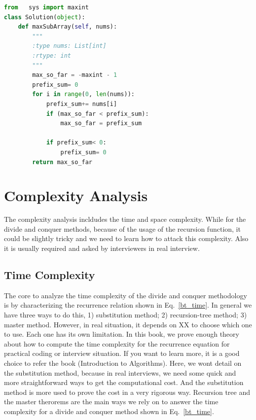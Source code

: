 \documentclass[../algorithms.tex]{subfiles}
\begin{document}
\begin{lstlisting}[language = Python]
from   sys import maxint
class Solution(object):    
    def maxSubArray(self, nums):
        """
        :type nums: List[int]
        :rtype: int
        """
        max_so_far = -maxint - 1
        prefix_sum= 0
        for i in range(0, len(nums)):
            prefix_sum+= nums[i]
            if (max_so_far < prefix_sum):
                max_so_far = prefix_sum
 
            if prefix_sum< 0:
                prefix_sum= 0  
        return max_so_far
\end{lstlisting}
\section{Complexity Analysis}
The complexity analysis incldudes the time and space complexity. While for the divide and conquer methods, because of the usage of the recursion function, it could be slightly tricky and we need to learn how to attack this complexity. Also it is usually required and asked by interviewers in real interview.

\subsection{Time Complexity}
The core to analyze the time complexity of the divide and conquer methodology is by characterizing the recurrence relation shown in Eq.~\ref{bt_time}. In general we have three ways to do this, 1) substitution method; 2) recursion-tree method; 3) master method. However, in real situation, it depends on XX to choose which one to use. Each one has its own limitation. In this book, we prove enough theory about how to compute the time complexity for the recurrence equation for practical coding or interview situation. If you want to learn more, it is a good choice to refer the book (Introduction to Algorithms). Here, we wont detail on the substitution method, because in real interviews, we need some quick and more straightforward ways to get the computational cost. And the substitution method is more used to prove the cost in a very rigorous way. Recursion tree and the master therorems are the main ways we rely on to answer the time complexity for a divide and conquer method shown in Eq.~\ref{bt_time}. 
\end{document}
